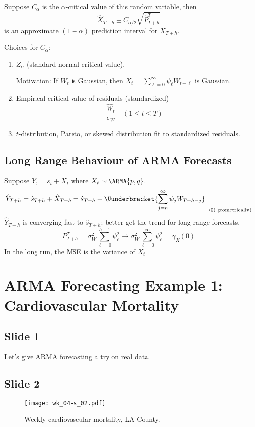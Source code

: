 Suppose $ C_\alpha $ is the $ \alpha $-critical value of this random variable,
then
\[ \hat{X}_{T+h}\pm C_{\alpha/2}\sqrt{\hat{P}_{T+h}^T} \]
is an approximate $ (1-\alpha) $ prediction interval for $ X_{T+h} $.

Choices for $ C_\alpha $:
\begin{enumerate}[(1)]
    \item $ Z_\alpha $ (standard normal critical value).

          Motivation: If $ W_t $ is Gaussian, then $ X_t=\sum_{\ell=0}^{\infty} \psi_\ell W_{t-\ell} $
          is Gaussian.
    \item Empirical critical value of residuals (standardized)
          \[ \frac{\hat{W}_{t}}{\sigma_W}\quad(1\le t\le T)  \]
    \item $ t $-distribution, Pareto, or skewed distribution fit to standardized residuals.
\end{enumerate}

\subsection*{Long Range Behaviour of ARMA Forecasts}
Suppose $ Y_t=s_t+X_t $ where $ X_t \sim \ARMA{p,q} $.
\[ \hat{Y}_{T+h}=\hat{s}_{T+h}+\hat{X}_{T+h}=\hat{s}_{T+h}+\Uunderbracket{\sum_{j=h}^{\infty} \psi_j W_{T+h-j}}_{\to 0(\text{ geometrically})} \]
$ \hat{Y}_{T+h} $ is converging fast to $ \hat{s}_{T+h} $: better get the trend for
long range forecasts.
\[ P_{T+h}^T=\sigma_W^2 \sum_{\ell=0}^{h-1} \psi_\ell^2\to \sigma_W^2 \sum_{\ell=0}^{\infty} \psi_\ell^2=\gamma_X(0) \]
In the long run, the MSE is the variance of $ X_t $.

\section{ARMA Forecasting Example 1: Cardiovascular Mortality}
\subsection*{Slide 1}
Let's give ARMA forecasting a try on real data.

\subsection*{Slide 2}
\begin{figure}[H]
    \centering
    \texttt{[image: wk\_04-s\_02.pdf]}
    \caption{Weekly cardiovascular mortality, LA County.}
\end{figure}

